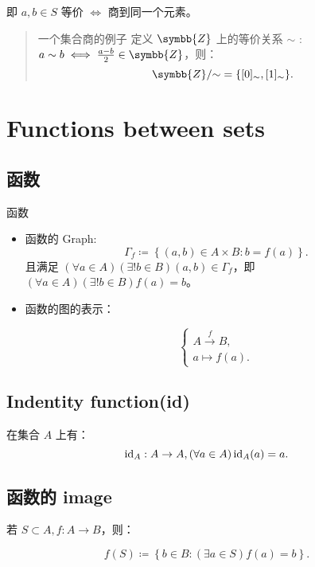 即 \(a,b\in S\) 等价 \(\iff\) 商到同一个元素。

\begin{quote}{一个集合商的例子}
    定义 \(\symbb{Z} \) 上的等价关系 \(\sim\) : \(a\sim b \iff \frac{a - b}{2} \in\symbb{Z}\)，则：
    \[
        \symbb{Z} /\mathord \sim = \left\{ [0]_{\sim} , [1]_{\sim} \right\}
        .\]
\end{quote}


\section{Functions between sets}


\subsection{函数}

\begin{defi}{函数}
    \begin{itemize}
        \item 函数的 Graph:
              \[
                  \Gamma _f \coloneqq \left\{ (a,b) \in A \times B : b = f(a) \right\}
                  .\]
              且满足 \((\forall a\in A)(\exists !b\in B) (a,b) \in \Gamma_f \)，即 \((\forall a\in A)(\exists !b\in B) f(a) = b\)。
        \item 函数的图的表示：

              \[
                  \begin{cases}
                      A \xrightarrow{f} B, \\
                      a \mapsto f(a).
                  \end{cases}
              \]
    \end{itemize}
\end{defi}

\subsection{Indentity function(id)}

在集合 \(A\) 上有：
\[
    \operatorname{id}_A : A\to A , (\forall a\in A)\operatorname{id}_A(a) = a
    .\]
\subsection{函数的 image}

若 \(S\subset A, f : A \to B\)，则：

\[
    f(S) \coloneqq \left\{ b\in B : (\exists a \in S) f(a) = b  \right\}
    .\]

